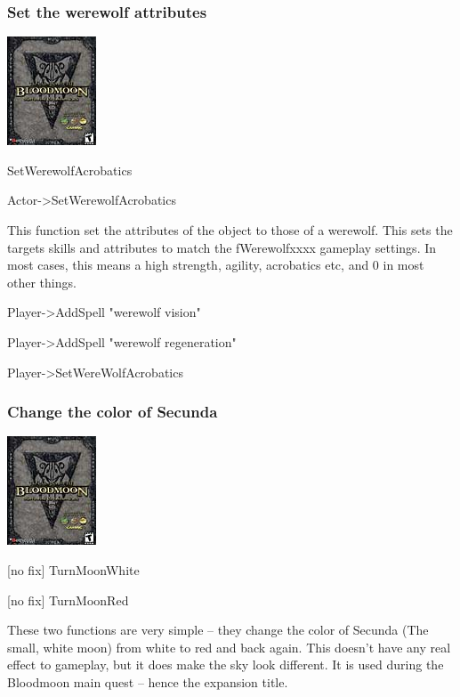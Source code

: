 \documentclass[
]{article}
\begin{document}
\hypertarget{set-the-werewolf-attributes}{%
\subsubsection{Set the werewolf
attributes}\label{set-the-werewolf-attributes}}

\includegraphics{media/image7.png}

SetWerewolfAcrobatics

Actor-\textgreater SetWerewolfAcrobatics

This function set the attributes of the object to those of a werewolf.
This sets the targets skills and attributes to match the fWerewolfxxxx
gameplay settings. In most cases, this means a high strength, agility,
acrobatics etc, and 0 in most other things.

Player-\textgreater AddSpell "werewolf vision"

Player-\textgreater AddSpell "werewolf regeneration"

Player-\textgreater SetWereWolfAcrobatics

\hypertarget{change-the-color-of-secunda}{%
\subsubsection{Change the color of
Secunda}\label{change-the-color-of-secunda}}

\includegraphics{media/image7.png}

{[}no fix{]} TurnMoonWhite

{[}no fix{]} TurnMoonRed

These two functions are very simple -- they change the color of Secunda
(The small, white moon) from white to red and back again. This doesn't
have any real effect to gameplay, but it does make the sky look
different. It is used during the Bloodmoon main quest -- hence the
expansion title.
\end{document}

